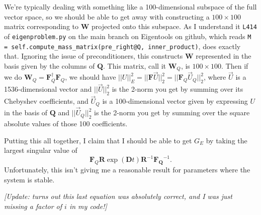 \documentclass[aps,pop,preprint]{revtex4}
\begin{document}
We're typically dealing with something like a 100-dimensional subspace of the full vector space, so we should be able to get away with constructing a $100 \times 100$ matrix corresponding to $\mathbf{W}$ projected onto this subspace. 
As I understand it \texttt{L414} of \texttt{eigenproblem.py} on the main branch on Eigentools on github, which reads \texttt{M = self.compute\_mass\_matrix(pre\_right@Q, inner\_product)}, does exactly that. 
Ignoring the issue of preconditioners, this constructs $\mathbf{W}$ represented in the basis given by the columns of $\mathbf{Q}$. 
This matrix, call it $\mathbf{W}_Q$, is $100 \times 100$. 
Then if we do $\mathbf{W}_Q = \mathbf{F}^\dagger_Q \mathbf{F}_Q$, we should have $||U||_E^2 = ||\mathbf{F} \vec{U}||_2^2 = ||\mathbf{F}_Q \vec{U}_Q||_2^2$, where $\vec{U}$ is a 1536-dimensional vector and $||\vec{U}||_2^2$ is the 2-norm you get by summing over its Chebyshev coefficients, and $\vec{U}_Q$ is a 100-dimensional vector given by expressing $U$ in the basis of $\mathbf{Q}$ and $||\vec{U}_Q||_2^2$ is the 2-norm you get by summing over the square absolute values of those 100 coefficients.

Putting this all together, I claim that I should be able to get $G_E$ by taking the largest singular value of
\begin{equation} \label{FQR_propagator}
\mathbf{F}_Q \mathbf{R} \exp(\mathbf{D} t) \mathbf{R}^{-1} \mathbf{F_Q}^{-1}.
\end{equation}
Unfortunately, this isn't giving me a reasonable result for parameters where the system is stable.

\textit{[Update: turns out this last equation was absolutely correct, and I was just missing a factor of $i$ in my code!]}
\end{document}

